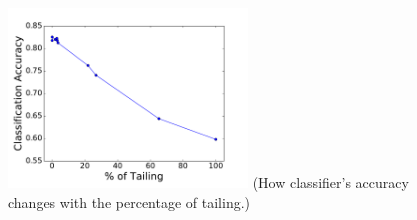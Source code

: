 

\begin{figure}[t!]
\begin{center}
\includegraphics[width=2.5in]{figure/accuracy}
{\footnotesize{(How classifier's accuracy changes with the percentage of tailing.)}}
\end{center}
\end{figure}


